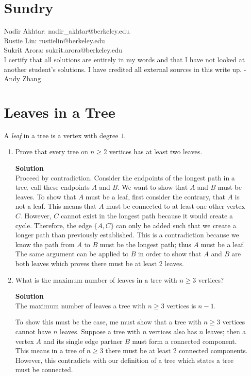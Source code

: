 \documentclass[11pt]{article}
\newcommand*{\Question}[1]{\section{#1}}
\newenvironment{Parts}{\begin{enumerate}[label=(\alph*)]}{\end{enumerate}}
\newcommand*{\Part}{\item}
\newenvironment{Answer}{\vspace{10pt}\begin{mdframed}\textbf{Solution}\\}{\end{mdframed}\vfill\pagebreak[3]}
\newenvironment{Answer}{\vspace{10pt}}{\vfill\pagebreak[3]}
\begin{document}
\Question{Sundry} 
\vspace{10pt}

Nadir Akhtar: nadir\_akhtar@berkeley.edu\\
Rustie Lin: rustielin@berkeley.edu\\
Sukrit Arora: sukrit.arora@berkeley.edu\\

I certify that all solutions are entirely in my words and that I have not looked at another student’s
solutions. I have credited all external sources in this write up. - Andy Zhang

\vfill\pagebreak[3]

\Question{Leaves in a Tree}

A {\em leaf} in a tree is a vertex with degree $1$.
\begin{Parts}
  \Part 
  Prove that every tree on $n \ge 2$ vertices has at least two leaves.
  
  \begin{Answer}
    Proceed by contradiction. Consider the endpoints of the longest path in a tree, call these endpoints $A$ and $B$. We want to show that $A$ and $B$ must be leaves. To show that $A$ must be a leaf, first consider the contrary, that $A$ is not a leaf. This means that $A$ must be connected to at least one other vertex $C$. However, $C$ cannot exist in the longest path because it would create a cycle. Therefore, the edge $\{A,C\}$ can only be added such that we create a longer path than previously established. This is a contradiction because we know the path from $A$ to $B$ must be the longest path; thus $A$ must be a leaf. The same argument can be applied to $B$ in order to show that $A$ and $B$ are both leaves which proves there must be at least 2 leaves.
  \end{Answer}
  

  \Part What is the maximum number of leaves in a tree with $n \ge 3$ vertices?

  \begin{Answer}
    The maximum number of leaves a tree with $n \geq 3$ vertices is $n-1$.
    
    To show this must be the case, me must show that a tree with $n \geq 3$ vertices cannot have $n$ leaves. Suppose a tree with $n$ vertices also has $n$ leaves; then a vertex $A$ and its single edge partner $B$ must form a connected component. This means in a tree of $n \geq 3$ there must be at least 2 connected components. However, this contradicts with our definition of a tree which states a tree must be connected.
  \end{Answer}

\end{Parts}
\end{document}
